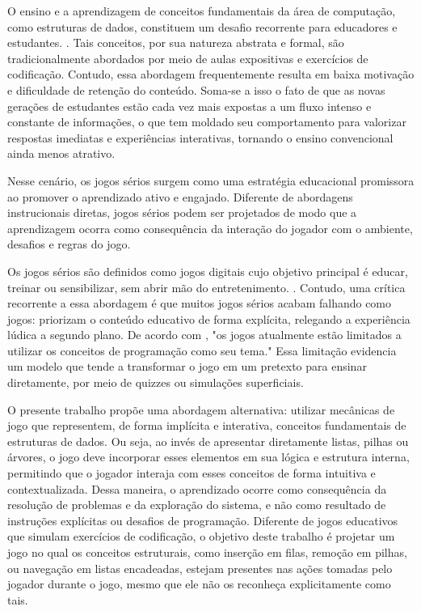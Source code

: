 O ensino e a aprendizagem de conceitos fundamentais da área de computação, como estruturas de dados, constituem um desafio recorrente para educadores e estudantes. . Tais conceitos, por sua natureza abstrata e formal, são tradicionalmente abordados por meio de aulas expositivas e exercícios de codificação. Contudo, essa abordagem frequentemente resulta em baixa motivação e dificuldade de retenção do conteúdo. Soma-se a isso o fato de que as novas gerações de estudantes estão cada vez mais expostas a um fluxo intenso e constante de informações, o que tem moldado seu comportamento para valorizar respostas imediatas e experiências interativas, tornando o ensino convencional ainda menos atrativo.

Nesse cenário, os jogos sérios surgem como uma estratégia educacional promissora ao promover o aprendizado ativo e engajado. Diferente de abordagens instrucionais diretas, jogos sérios podem ser projetados de modo que a aprendizagem ocorra como consequência da interação do jogador com o ambiente, desafios e regras do jogo. 

Os jogos sérios são definidos como jogos digitais cujo objetivo principal é educar, treinar ou sensibilizar, sem abrir mão do entretenimento. . Contudo, uma crítica recorrente a essa abordagem é que muitos jogos sérios acabam falhando como jogos: priorizam o conteúdo educativo de forma explícita, relegando a experiência lúdica a segundo plano. De acordo com \cite{de2025codebo}, "os jogos atualmente estão limitados a utilizar os conceitos de programação como seu tema." Essa limitação evidencia um modelo que tende a transformar o jogo em um pretexto para ensinar diretamente, por meio de quizzes ou simulações superficiais.

O presente trabalho propõe uma abordagem alternativa: utilizar mecânicas de jogo que representem, de forma implícita e interativa, conceitos fundamentais de estruturas de dados. Ou seja, ao invés de apresentar diretamente listas, pilhas ou árvores, o jogo deve incorporar esses elementos em sua lógica e estrutura interna, permitindo que o jogador interaja com esses conceitos de forma intuitiva e contextualizada. Dessa maneira, o aprendizado ocorre como consequência da resolução de problemas e da exploração do sistema, e não como resultado de instruções explícitas ou desafios de programação. Diferente de jogos educativos que simulam exercícios de codificação, o objetivo deste trabalho é projetar um jogo no qual os conceitos estruturais, como inserção em filas, remoção em pilhas, ou navegação em listas encadeadas, estejam presentes nas ações tomadas pelo jogador durante o jogo, mesmo que ele não os reconheça explicitamente como tais.
